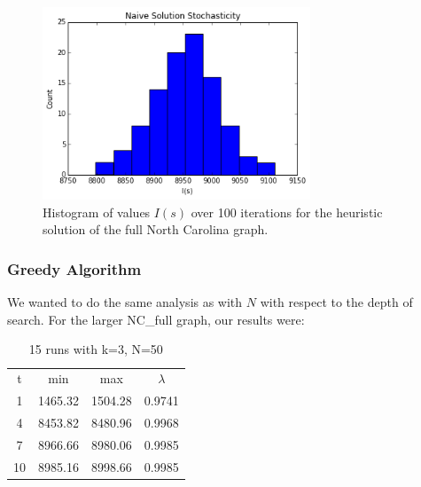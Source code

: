 \documentclass{article}
\begin{document}
	\begin{figure}[h!]
		\centering
		\includegraphics[width=80mm]{NC_full_solution_hist.png}
		\caption{Histogram of values $I(s)$ over 100 iterations for the heuristic solution of the full North Carolina graph.}
		\label{fig:naive}
	\end{figure} 
	
	

	\subsubsection{Greedy Algorithm}
	
	We wanted to do the same analysis as with $N$ with respect to the depth of search. For the larger NC\_full graph, our results were:
	
	\begin{table}[h!]
		\begin{center}
			\caption{15 runs with k=3, N=50}
			\label{tab:table2}
			\begin{tabular}{|c|c|c|c|} 
				\hline
				t & min & max & $\lambda$\\
				1  & 1465.32 & 1504.28 & 0.9741\\
				4  & 8453.82 & 8480.96 & 0.9968\\
				7  & 8966.66 & 8980.06 & 0.9985\\
				10 & 8985.16 & 8998.66 & 0.9985\\
				\hline
			\end{tabular}
		\end{center}
	\end{table}
	
\end{document}
